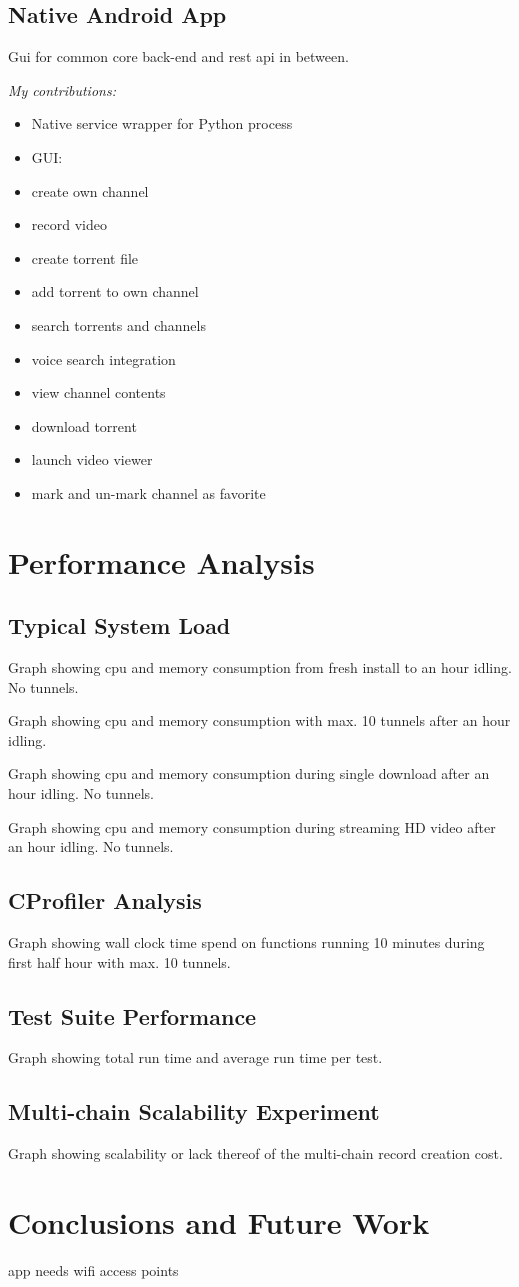\documentclass[]{report}
\begin{document}
\section{Native Android App}
Gui for common core back-end and rest api in between.

\emph{My contributions:}
\begin{itemize}
	\item Native service wrapper for Python process
	\item GUI:
	\item create own channel
	\item record video
	\item create torrent file
	\item add torrent to own channel
	\item search torrents and channels
	\item voice search integration
	\item view channel contents
	\item download torrent
	\item launch video viewer
	\item mark and un-mark channel as favorite
\end{itemize}



\chapter{Performance Analysis}

\section{Typical System Load}
Graph showing cpu and memory consumption from fresh install to an hour idling. No tunnels.

Graph showing cpu and memory consumption with max. 10 tunnels after an hour idling.

Graph showing cpu and memory consumption during single download after an hour idling. No tunnels.

Graph showing cpu and memory consumption during streaming HD video after an hour idling. No tunnels.


\section{CProfiler Analysis}
Graph showing wall clock time spend on functions running 10 minutes during first half hour with max. 10 tunnels.


\section{Test Suite Performance}
Graph showing total run time and average run time per test.


\section{Multi-chain Scalability Experiment}
Graph showing scalability or lack thereof of the multi-chain record creation cost.


\chapter{Conclusions and Future Work}
app needs wifi access points
\end{document}
